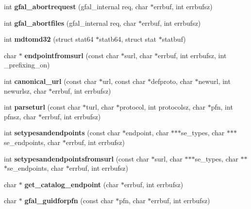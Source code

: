\begin{CompactItemize}
\item 
int \textbf{gfal\_\-abortrequest} (gfal\_\-internal req, char $\ast$errbuf, int errbufsz)\label{gfal__common_8c_aca24e1095b862293529fec208518384}

\item 
int \textbf{gfal\_\-abortfiles} (gfal\_\-internal req, char $\ast$errbuf, int errbufsz)\label{gfal__common_8c_37f6d2d8ea0ad96d32e8542bd59adf63}

\item 
int \textbf{mdtomd32} (struct stat64 $\ast$statb64, struct stat $\ast$statbuf)\label{gfal__common_8c_cd29b5992fa6526c74fa4d1fb630a02d}

\item 
char $\ast$ \textbf{endpointfromsurl} (const char $\ast$surl, char $\ast$errbuf, int errbufsz, int \_\-prefixing\_\-on)\label{gfal__common_8c_fb27343aaad36ce664aa6a26cac94fc2}

\item 
int \textbf{canonical\_\-url} (const char $\ast$url, const char $\ast$defproto, char $\ast$newurl, int newurlsz, char $\ast$errbuf, int errbufsz)\label{gfal__common_8c_951b857d6ce43fd8a8914844b5de559a}

\item 
int \textbf{parseturl} (const char $\ast$turl, char $\ast$protocol, int protocolsz, char $\ast$pfn, int pfnsz, char $\ast$errbuf, int errbufsz)\label{gfal__common_8c_1592fb1bdd6aa5ab4c56e3aaf9240b98}

\item 
int \textbf{setypesandendpoints} (const char $\ast$endpoint, char $\ast$$\ast$$\ast$se\_\-types, char $\ast$$\ast$$\ast$se\_\-endpoints, char $\ast$errbuf, int errbufsz)\label{gfal__common_8c_42f0dde4abdd73f485da45932283f669}

\item 
int \textbf{setypesandendpointsfromsurl} (const char $\ast$surl, char $\ast$$\ast$$\ast$se\_\-types, char $\ast$$\ast$$\ast$se\_\-endpoints, char $\ast$errbuf, int errbufsz)\label{gfal__common_8c_563ab483cd3ebb8e7d365d7803523ff5}

\item 
char $\ast$ \textbf{get\_\-catalog\_\-endpoint} (char $\ast$errbuf, int errbufsz)\label{gfal__common_8c_43eaae6782e74a6d25cd0a0f8183833e}

\item 
char $\ast$ \textbf{gfal\_\-guidforpfn} (const char $\ast$pfn, char $\ast$errbuf, int errbufsz)\label{group__internal__group_g86568afb8c7f9b0d6944de793a3e867a}


\end{CompactItemize}
